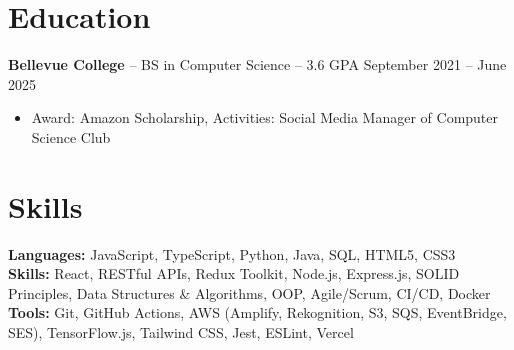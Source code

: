 \documentclass[11pt]{article}
\begin{document}
\vspace{-18.5pt}

\section*{Education}
\textbf{Bellevue College} -- BS in Computer Science -- 3.6 GPA \hfill September 2021 -- June 2025\\
\vspace{-9pt}
\begin{itemize}
  \item Award: Amazon Scholarship, Activities: Social Media Manager of Computer Science Club
\end{itemize}

\vspace{-18.5pt}

\section*{Skills}
\textbf{Languages:} JavaScript, TypeScript, Python, Java, SQL, HTML5, CSS3\\
\textbf{Skills:} React, RESTful APIs, Redux Toolkit, Node.js, Express.js, SOLID Principles, Data Structures \& Algorithms, OOP, Agile/Scrum, CI/CD, Docker\\
\textbf{Tools:} Git, GitHub Actions, AWS (Amplify, Rekognition, S3, SQS, EventBridge, SES), TensorFlow.js, Tailwind CSS, Jest, ESLint, Vercel

\vspace{-6.5pt}
\end{document}
